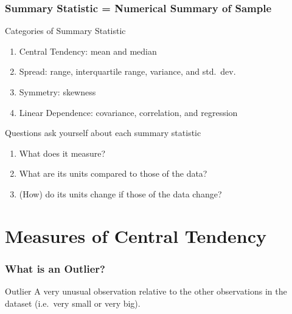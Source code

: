 \begin{frame}
\frametitle{Summary Statistic =  Numerical Summary of Sample}

\begin{block}{Categories of Summary Statistic}
\begin{enumerate}
\item Central Tendency: mean and median
\item Spread: range, interquartile range, variance, and std.\ dev.\
\item Symmetry: skewness 
\item Linear Dependence: covariance, correlation, and regression
\end{enumerate}
\end{block}

\begin{block}{Questions ask yourself about each summary statistic}
\begin{enumerate}
\item What does it measure?
\item What are its units compared to those of the data?
\item (How) do its units change if those of the data change?
\end{enumerate}
\end{block}
\end{frame}

\section{Measures of Central Tendency}

\begin{frame}
\frametitle{What is an Outlier?}
	\begin{block}{Outlier}
	A very unusual observation relative to the other observations in the dataset (i.e.\ very small or very big).
\end{block}
\end{frame}


